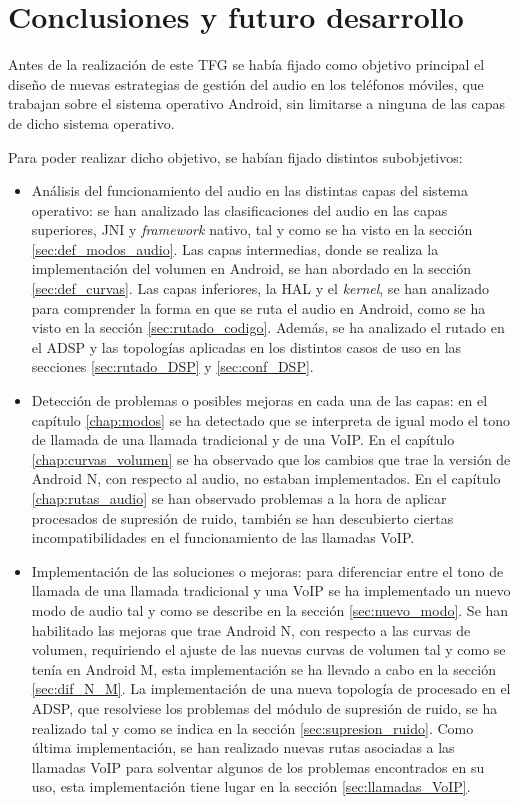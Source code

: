 \chapter{Conclusiones y futuro desarrollo}
Antes de la realización de este \gls{TFG} se había fijado como objetivo principal el diseño de nuevas estrategias de gestión del audio en los teléfonos móviles, que trabajan sobre el sistema operativo Android, sin limitarse a ninguna de las capas de dicho sistema operativo.

Para poder realizar dicho objetivo, se habían fijado distintos subobjetivos:
\begin{itemize}
	\item{Análisis del funcionamiento del audio en las distintas capas del sistema operativo: se han analizado las clasificaciones del audio en las capas superiores, \gls{JNI} y \textit{framework} nativo, tal y como se ha visto en la sección \ref{sec:def_modos_audio}. Las capas intermedias, donde se realiza la implementación del volumen en Android, se han abordado en la sección \ref{sec:def_curvas}. Las capas inferiores, la \gls{HAL} y el \textit{kernel}, se han analizado para comprender la forma en que se ruta el audio en Android, como se ha visto en la sección \ref{sec:rutado_codigo}. Además, se ha analizado el rutado en el \gls{ADSP} y las topologías aplicadas en los distintos casos de uso en las secciones \ref{sec:rutado_DSP} y \ref{sec:conf_DSP}.}
	\item{Detección de problemas o posibles mejoras en cada una de las capas: en el capítulo \ref{chap:modos} se ha detectado que se interpreta de igual modo el tono de llamada de una llamada tradicional y de una \gls{VoIP}. En el capítulo \ref{chap:curvas_volumen} se ha observado que los cambios que trae la versión de Android N, con respecto al audio, no estaban implementados. En el capítulo \ref{chap:rutas_audio} se han observado problemas a la hora de aplicar procesados de supresión de ruido, también se han descubierto ciertas incompatibilidades en el funcionamiento de las llamadas \gls{VoIP}.}
	\item{Implementación de las soluciones o mejoras: para diferenciar entre el tono de llamada de una llamada tradicional y una \gls{VoIP} se ha implementado un nuevo modo de audio tal y como se describe en la sección \ref{sec:nuevo_modo}. Se han habilitado las mejoras que trae Android N, con respecto a las curvas de volumen, requiriendo el ajuste de las nuevas curvas de volumen tal y como se tenía en Android M, esta implementación se ha llevado a cabo en la sección \ref{sec:dif_N_M}. La implementación de una nueva topología de procesado en el \gls{ADSP}, que resolviese los problemas del módulo de supresión de ruido, se ha realizado tal y como se indica en la sección \ref{sec:supresion_ruido}. Como última implementación, se han realizado nuevas rutas asociadas a las llamadas \gls{VoIP} para solventar algunos de los problemas encontrados en su uso, esta implementación tiene lugar en la sección \ref{sec:llamadas_VoIP}.}

\end{itemize}
